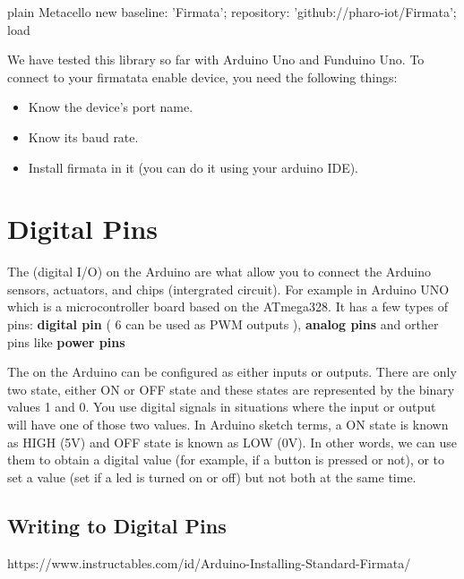 \documentclass[10pt,twoside,english]{_support/latex/sbabook/sbabook}
\begin{document}
\begin{displaycode}{plain}
  Metacello new
  baseline: 'Firmata';
  repository: 'github://pharo-iot/Firmata';
  load
\end{displaycode}

We have tested this library so far with Arduino Uno and Funduino Uno. 
To connect to your firmatata enable device, you need the following things:

\begin{itemize}
\item Know the device's port name.
\item Know its baud rate.
\item Install firmata in it (you can do it using your arduino IDE).
\end{itemize}
\section{Digital Pins}
The  (digital I/O) on the Arduino are what allow you to connect the Arduino sensors, actuators, and chips (intergrated circuit).
For example in Arduino UNO which is a microcontroller board based on the ATmega328. It has a few types of pins: \textbf{digital pin} ( 6 can be used as PWM outputs ), \textbf{analog pins} and orther pins like \textbf{power pins}

The  on the Arduino can be configured as either inputs or outputs. There are only two state, either ON or OFF state and these states are represented by the binary values 1 and 0. You use digital signals in situations where the input or output will have one of those two values. In Arduino sketch terms, a ON state is known as HIGH (5V) and OFF state is known as LOW (0V). In other words, we can use them to obtain a digital value (for example, if a button is pressed or not), or to set a value (set if a led is turned on or off) but not both at the same time.
\subsection{Writing to Digital Pins}
https://www.instructables.com/id/Arduino-Installing-Standard-Firmata/






\backmatter

\end{document}
